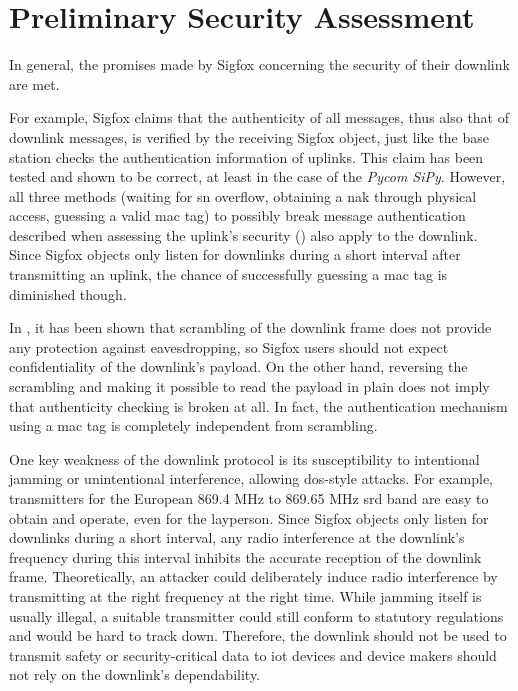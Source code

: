\FloatBarrier
\section{Preliminary Security Assessment}
In general, the promises made by Sigfox concerning the security of their downlink \cite[Section 2.2]{sigfox_security_whitepaper} are met.

For example, Sigfox claims that the authenticity of all messages, thus also that of downlink messages, is verified by the receiving Sigfox object, just like the base station checks the authentication information of uplinks.
This claim has been tested and shown to be correct, at least in the case of the \textit{Pycom SiPy}.
However, all three methods (waiting for \gls{sn} overflow, obtaining a \gls{nak} through physical access, guessing a valid \gls{mac} tag) to possibly break message authentication described when assessing the uplink's security () also apply to the downlink.
Since Sigfox objects only listen for downlinks during a short interval after transmitting an uplink, the chance of successfully guessing a \gls{mac} tag is diminished though.

In , it has been shown that scrambling of the downlink frame does not provide any protection against eavesdropping, so Sigfox users should not expect confidentiality of the downlink's payload.
On the other hand, reversing the scrambling and making it possible to read the payload in plain does not imply that authenticity checking is broken at all.
In fact, the authentication mechanism using a \gls{mac} tag is completely independent from scrambling.

One key weakness of the downlink protocol is its susceptibility to intentional jamming or unintentional interference, allowing \gls{dos}-style attacks.
For example, transmitters for the European 869.4 MHz to 869.65 MHz \gls{srd} band are easy to obtain and operate, even for the layperson.
Since Sigfox objects only listen for downlinks during a short interval, any radio interference at the downlink's frequency during this interval inhibits the accurate reception of the downlink frame.
Theoretically, an attacker could deliberately induce radio interference by transmitting at the right frequency at the right time.
While jamming itself is usually illegal, a suitable transmitter could still conform to statutory regulations and would be hard to track down.
Therefore, the downlink should not be used to transmit safety or security-critical data to \gls{iot} devices and device makers should not rely on the downlink's dependability.
